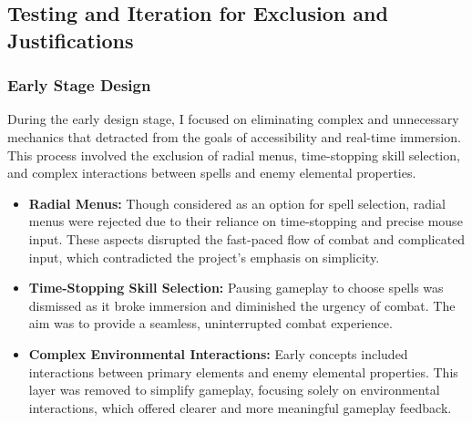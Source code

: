 \documentclass[10pt,twocolumn]{article}
\begin{document}
\subsection{Testing and Iteration for Exclusion and Justifications}

\subsubsection{Early Stage Design}
During the early design stage, I focused on eliminating complex and unnecessary mechanics that detracted from the goals of accessibility and real-time immersion. This process involved the exclusion of radial menus, time-stopping skill selection, and complex interactions between spells and enemy elemental properties.
\begin{itemize}
    \item \textbf{Radial Menus:} Though considered as an option for spell selection, radial menus were rejected due to their reliance on time-stopping and precise mouse input. These aspects disrupted the fast-paced flow of combat and complicated input, which contradicted the project’s emphasis on simplicity.
    \item \textbf{Time-Stopping Skill Selection:} Pausing gameplay to choose spells was dismissed as it broke immersion and diminished the urgency of combat. The aim was to provide a seamless, uninterrupted combat experience.
    \item \textbf{Complex Environmental Interactions:} Early concepts included interactions between primary elements and enemy elemental properties. This layer was removed to simplify gameplay, focusing solely on environmental interactions, which offered clearer and more meaningful gameplay feedback.
\end{itemize}
\end{document}

